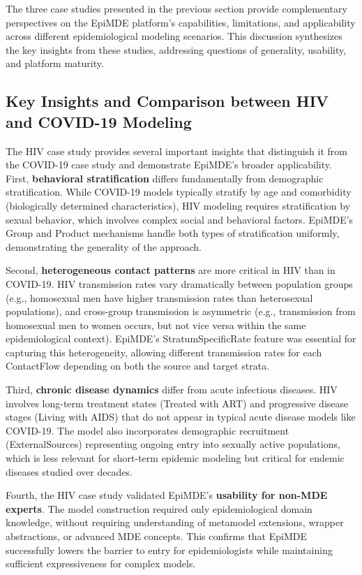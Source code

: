 The three case studies presented in the previous section provide complementary perspectives on the EpiMDE platform's capabilities, limitations, and applicability across different epidemiological modeling scenarios. This discussion synthesizes the key insights from these studies, addressing questions of generality, usability, and platform maturity.

\subsection{Key Insights and Comparison between HIV and COVID-19 Modeling}

The HIV case study provides several important insights that distinguish it from the COVID-19 case study and demonstrate EpiMDE's broader applicability. First, \textbf{behavioral stratification} differs fundamentally from demographic stratification. While COVID-19 models typically stratify by age and comorbidity (biologically determined characteristics), HIV modeling requires stratification by sexual behavior, which involves complex social and behavioral factors. EpiMDE's Group and Product mechanisms handle both types of stratification uniformly, demonstrating the generality of the approach.

Second, \textbf{heterogeneous contact patterns} are more critical in HIV than in COVID-19. HIV transmission rates vary dramatically between population groups (e.g., homosexual men have higher transmission rates than heterosexual populations), and cross-group transmission is asymmetric (e.g., transmission from homosexual men to women occurs, but not vice versa within the same epidemiological context). EpiMDE's StratumSpecificRate feature was essential for capturing this heterogeneity, allowing different transmission rates for each ContactFlow depending on both the source and target strata.

Third, \textbf{chronic disease dynamics} differ from acute infectious diseases. HIV involves long-term treatment states (Treated with ART) and progressive disease stages (Living with AIDS) that do not appear in typical acute disease models like COVID-19. The model also incorporates demographic recruitment (ExternalSources) representing ongoing entry into sexually active populations, which is less relevant for short-term epidemic modeling but critical for endemic diseases studied over decades.

Fourth, the HIV case study validated EpiMDE's \textbf{usability for non-MDE experts}. The model construction required only epidemiological domain knowledge, without requiring understanding of metamodel extensions, wrapper abstractions, or advanced MDE concepts. This confirms that EpiMDE successfully lowers the barrier to entry for epidemiologists while maintaining sufficient expressiveness for complex models.

